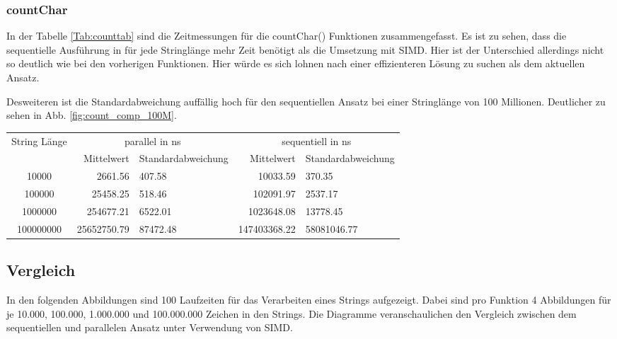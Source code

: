 \documentclass[plainarticle,zihtitle,german,final,hyperref,utf8]{zihpub}
\begin{document}
\subsubsection{countChar}
In der Tabelle \ref{Tab:counttab} sind die Zeitmessungen für die countChar() Funktionen zusammengefasst.
Es ist zu sehen, dass die sequentielle Ausführung in für jede Stringlänge mehr Zeit benötigt als die Umsetzung mit SIMD. Hier ist der Unterschied allerdings nicht so deutlich wie bei den vorherigen Funktionen. Hier würde es sich lohnen nach einer effizienteren Lösung zu suchen als dem aktuellen Ansatz.

Desweiteren ist die Standardabweichung auffällig hoch für den sequentiellen Ansatz bei einer Stringlänge von 100 Millionen. Deutlicher zu sehen in Abb. \ref{fig:count_comp_100M}.
\newline
\begin{tabular}{|c|r|l|r|l|}
	\hline
	\multicolumn{1}{|c|}{String Länge} & \multicolumn{2}{c|}{parallel in ns} & \multicolumn{2}{c|}{sequentiell in ns} \\
	\cline{2-5}
	& Mittelwert & Standardabweichung  & Mittelwert & Standardabweichung \\
	\hline
	10000 & 2661.56 & 407.58 & 10033.59 & 370.35 \\
	100000 & 25458.25 & 518.46 & 102091.97 & 2537.17 \\
	1000000 & 254677.21 & 6522.01 & 1023648.08 & 13778.45 \\
	100000000 & 25652750.79 & 87472.48 & 147403368.22 & 58081046.77 \\

	\hline
\end{tabular}
\label{Tab:counttab}

\newpage
\subsection{Vergleich}
In den folgenden Abbildungen sind 100 Laufzeiten für das Verarbeiten eines Strings aufgezeigt. Dabei sind pro Funktion 4 Abbildungen für je 10.000, 100.000, 1.000.000 und 100.000.000 Zeichen in den Strings. Die Diagramme veranschaulichen den Vergleich zwischen dem sequentiellen und parallelen Ansatz unter Verwendung von SIMD.
\end{document}
